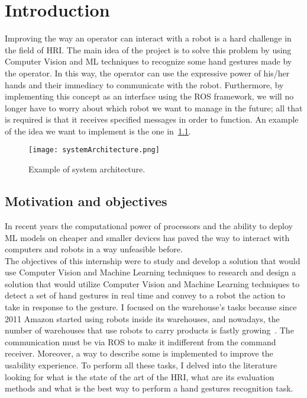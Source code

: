 \documentclass[../thesis.tex]{subfiles}
\begin{document}
\chapter{Introduction}\label{cap:introduction}
Improving the way an operator can interact with a robot is a hard challenge in the field of \acrfull{HRI}. The main idea of the project is to solve this problem by using Computer Vision and \acrfull{ML} techniques to recognize some hand gestures made by the operator. In this way, the operator can use the expressive power of his/her hands and their immediacy to communicate with the robot. Furthermore, by implementing this concept as an interface using the \acrfull{ROS} framework, we will no longer have to worry about which robot we want to manage in the future; all that is required is that it receives specified messages in order to function. An example of the idea we want to implement is the one in~\ref{fig:systemArchitecture}.

\begin{figure}[H]
  \centering
  \texttt{[image: systemArchitecture.png]}
  \caption{Example of system architecture.}
  \label{fig:systemArchitecture}
\end{figure}

\section{Motivation and objectives}\label{s:motivation-and-objectives}
In recent years the computational power of processors and the ability to deploy \acrshort{ML} models on cheaper and smaller devices has paved the way to interact with computers and robots in a way unfeasible before.\\
The objectives of this internship were to study and develop a solution that would use Computer Vision and Machine Learning techniques to research and design a solution that would utilize Computer Vision and Machine Learning techniques to detect a set of hand gestures in real time and convey to a robot the action to take in response to the gesture. I focused on the warehouse's tasks because since 2011 Amazon started using robots inside its warehouses, and nowadays, the number of warehouses that use robots to carry products is fastly growing~\cite{paper:bogue2016}. The communication must be via \acrshort{ROS} to make it indifferent from the command receiver. Moreover, a way to describe some  is implemented to improve the usability experience. To perform all these tasks, I delved into the literature looking for what is the state of the art of the \acrshort{HRI}, what are its evaluation methods and what is the best way to perform a hand gestures recognition task.
\end{document}
